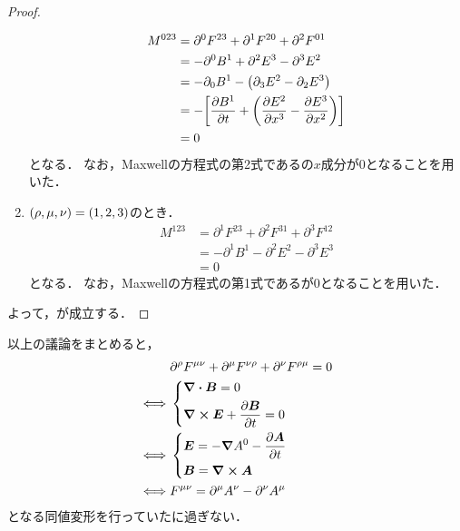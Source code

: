 \documentclass{report}
\begin{document}
\begin{proof}
\begin{enumerate}
          \begin{align}
            M^{023} &= \partial^0F^{23} + \partial^1F^{20} + \partial^2F^{01} \\ 
            &= -\partial^0B^1 + \partial^2E^3 - \partial^3E^2 \\ 
            &= -\partial_0B^1 - \qty(\partial_3E^2 - \partial_2E^3) \\ 
            &= -\qty[\pdv{B^1}{t} + \qty(\pdv{E^2}{x^3} - \pdv{E^3}{x^2})] \\ 
            &= 0
          \end{align}
          となる．
          なお，Maxwellの方程式の第2式であるの$x$成分が0となることを用いた．
        \item $\qty(\rho, \mu, \nu) = (1, 2, 3)$のとき．
          \begin{align}
            M^{123} &= \partial^1F^{23} + \partial^2F^{31} + \partial^3F^{12} \\ 
            &= -\partial^1B^1 - \partial^2E^2 - \partial^3E^3 \\ 
            &= 0
          \end{align}
          となる．
          なお，Maxwellの方程式の第1式であるが0となることを用いた．
      \end{enumerate}
      よって，が成立する．
    \end{proof}
    以上の議論をまとめると，
    \begin{align}
      &\partial^{\rho}F^{\mu\nu} + \partial^{\mu}F^{\nu\rho} + \partial^{\nu}F^{\rho\mu} = 0 \\ 
      \iff& \begin{dcases}
        \div\bm{B} = 0 \\ 
        \curl\bm{E} + \pdv{\bm{B}}{t} = 0
      \end{dcases} \\ 
      \iff& \begin{dcases} 
        \bm{E} = -\grad A^0 -\pdv{\bm{A}}{t} \\ 
        \bm{B} = \curl{\bm{A}}
      \end{dcases} \\ 
      \iff& F^{\mu\nu} = \partial^{\mu}A^{\nu} - \partial^{\nu}A^{\mu}
    \end{align}
    となる同値変形を行っていたに過ぎない．
\end{document}
